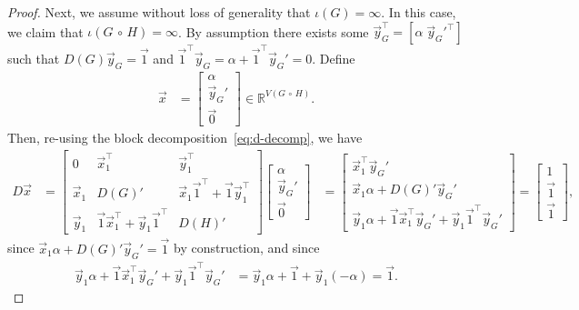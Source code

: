 \documentclass[10pt,a4paper]{amsart}
\newcommand{\Circ}{\circ}
\newcommand{\distmatrix}{D}
\newcommand{\one}{\vec{1}}
\newcommand{\x}{\vec{x}}
\newcommand{\y}{\vec{y}}
\begin{document}
\begin{proof}
        Next, we assume without loss of generality that $\iota(G) = \infty$. In this case, we claim that $\iota(G\,\Circ\,H) = \infty$. By assumption there exists some $\y_G^\top = [\alpha\; \y_G'^\top]$ such that $\distmatrix(G)\y_G = \one$ and $\one^\top \y_G = \alpha + \one^\top \y_G' = 0$.  Define
            \begin{align*}
                \x &= \begin{bmatrix}
                    \alpha \\ \y_G' \\ \vec{0}
                \end{bmatrix} \in\mathbb{R}^{V(G\,\Circ\,H)}.
            \end{align*}
        Then, re-using the block decomposition~\cref{eq:d-decomp}, we have
            \begin{align*}
                \distmatrix \x &= \begin{bmatrix}
                    0 & \x_{1}^\top & \y_{1}^\top\\
                    \x_{1} & {\distmatrix(G)}' & \x_{1}\one^\top + \one \y_{1}^\top\\
                    \y_{1} & \one \x_{1}^\top + \y_{1}\one^\top & {\distmatrix(H)}'
                \end{bmatrix}\begin{bmatrix}
                    \alpha \\ \y_G' \\ \vec{0}
                \end{bmatrix} &= \begin{bmatrix}
                    \x_{1}^\top \y_G'\\
                    \x_{1} \alpha + {\distmatrix(G)}' \y_G'\\
                    \y_{1} \alpha + \one \x_{1}^\top \y_G' + \y_1\one^\top\y_G'
                \end{bmatrix} = \begin{bmatrix}
                    1\\
                    \one\\
                    \one
                \end{bmatrix},
            \end{align*}
        since $\x_1 \alpha + {\distmatrix(G)}' \y_G' = \one$ by construction, and since
            \begin{align*}
                \y_{1} \alpha + \one \x_{1}^\top \y_G' + \y_1\one^\top\y_G' &= \y_{1} \alpha + \one + \y_1(-\alpha) = \one.

\end{align*}
\end{proof}
\end{document}
